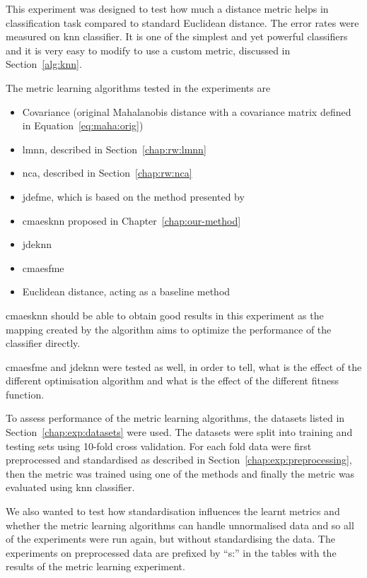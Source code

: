 This experiment was designed to test how much a distance metric helps in classification task compared to standard Euclidean distance. The error rates were measured on \ac{knn} classifier. It is one of the simplest and yet powerful classifiers and it is very easy to modify to use a custom metric, discussed in Section~\ref{alg:knn}.

The metric learning algorithms tested in the experiments are 

\begin{itemize}
\item Covariance (original Mahalanobis distance with a covariance matrix defined in Equation~\ref{eq:maha:orig})
\item \ac{lmnn}, described in Section~\ref{chap:rw:lmnn}
\item \ac{nca}, described in Section~\ref{chap:rw:nca}
\item \ac{jdefme}, which is based on the method presented by~\citep{fukui2013evolutionary}

\item \ac{cmaesknn} proposed in Chapter~\ref{chap:our-method}

\item \acf{jdeknn}
\item \acf{cmaesfme}

\item Euclidean distance, acting as a baseline method
\end{itemize}

\ac{cmaesknn} should be able to obtain good results in this experiment as the mapping created by the algorithm aims to optimize the performance of the classifier directly.

\ac{cmaesfme} and \ac{jdeknn} were tested as well, in order to tell, what is the effect of the different optimisation algorithm and what is the effect of the different fitness function.

To assess performance of the metric learning algorithms, the datasets listed in Section~\ref{chap:exp:datasets} were used. The datasets were split into training and testing sets using 10-fold cross validation. For each fold data were first preprocessed and standardised as described in Section~\ref{chap:exp:preprocessing}, then the metric was trained using one of the methods and finally the metric was evaluated using \ac{knn} classifier.

We also wanted to test how standardisation influences the learnt metrics and whether the metric learning algorithms can handle unnormalised data and so all of the experiments were run again, but without standardising the data. The experiments on preprocessed data are prefixed by ``s:'' in the tables with the results of the metric learning experiment.

